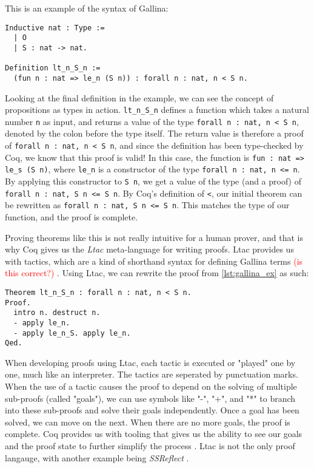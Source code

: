 This is an example of the syntax of Gallina:

\begin{minipage}{\linewidth}
\begin{lstlisting}[language=Coq, label={lst:gallina_ex}, caption={Example of Gallina syntax}]
Inductive nat : Type :=
  | O
  | S : nat -> nat.

Definition lt_n_S_n :=
  (fun n : nat => le_n (S n)) : forall n : nat, n < S n.
\end{lstlisting}
\end{minipage}

Looking at the final definition in the example, we can see the
concept of propositions as types in action.
\lstinline{lt_n_S_n} defines a function which takes a natural number \lstinline{n}
as input, and returns a value of the type \lstinline{forall n : nat, n < S n},
denoted by the colon before the type itself.
The return value is therefore a proof of \lstinline{forall n : nat, n < S n}, and since
the definition has been type-checked by Coq, we know that this proof is valid!
In this case, the function is
\lstinline{fun : nat => le_s (S n)}, where \lstinline{le_n} is a constructor
of the type \lstinline{forall n : nat, n <= n}. By applying this constructor
to \lstinline{S n}, we get a value of the type (and a proof) of
\lstinline{forall n : nat, S n <= S n}. By Coq's definition of \lstinline{<},
our initial theorem can be rewritten as \lstinline{forall n : nat, S n <= S n}.
This matches the type of our function, and the proof is complete.

Proving theorems like this is not really intuitive for a human prover,
and that is why Coq gives us the \textit{Ltac} meta-language for writing proofs.
Ltac provides us with tactics, which are a kind of shorthand syntax for defining Gallina terms \textcolor{red}{(is this correct?)} \cite{cltac}.
Using Ltac, we can rewrite the proof from \ref{lst:gallina_ex} as such:

\begin{minipage}{\linewidth}
\begin{lstlisting}[language=Coq, label={lst:ltac_ex}, caption={Example of Ltac syntax}]
Theorem lt_n_S_n : forall n : nat, n < S n.
Proof.
  intro n. destruct n.
  - apply le_n.
  - apply le_n_S. apply le_n.
Qed.
\end{lstlisting}
\end{minipage}

When developing proofs using Ltac, each tactic is executed or "played" one by one,
much like an interpreter. The tactics are seperated by punctuation marks.
When the use of a tactic causes the proof to depend on the solving of multiple sub-proofs (called "goals"),
we can use symbols like "-", "+", and "*" to branch into these sub-proofs and solve their goals independently.
Once a goal has been solved, we can move on the next. When there are no more goals, the proof is complete.
Coq provides us with tooling that gives us the ability to see our goals and the proof state
to further simplify the process \cite{cide}.
Ltac is not the only proof langauge, with another example being \textit{SSReflect} \cite{cssr}.

